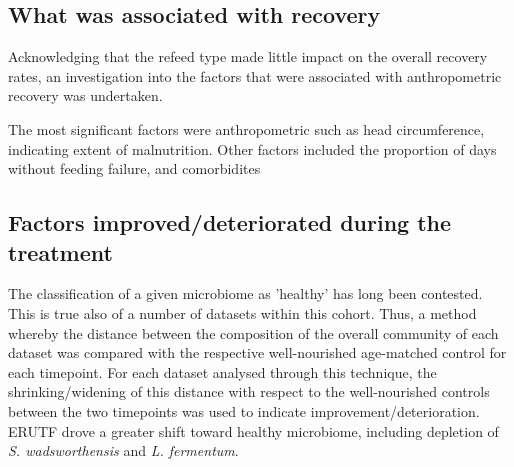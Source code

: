\documentclass{article}
\begin{document}
\subsection{What was associated with recovery}
Acknowledging that the refeed type made little impact on the overall recovery rates, an investigation into the factors that were associated with anthropometric recovery was undertaken.

The most significant factors were anthropometric such as head circumference, indicating extent of malnutrition.
Other factors included the proportion of days without feeding failure, and comorbidites
 
\subsection{Factors improved/deteriorated during the treatment}
The classification of a given microbiome as 'healthy' has long been contested.
This is true also of a number of datasets within this cohort.
Thus, a method whereby the distance between the composition of the overall community of each dataset was compared with the respective well-nourished age-matched control for each timepoint.
For each dataset analysed through this technique, the shrinking/widening of this distance with respect to the well-nourished controls between the two timepoints was used to indicate improvement/deterioration.
ERUTF drove a greater shift toward healthy microbiome, including depletion of \textit{S. wadsworthensis} and \textit{L. fermentum}.
\end{document}
